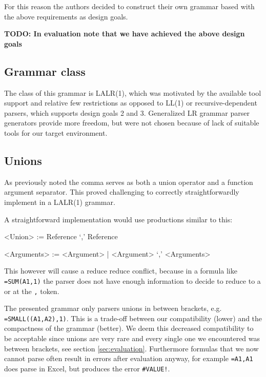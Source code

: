 \documentclass[conference]{IEEEtran}
\newcommand{\todo}[1]{\textbf{TODO: #1}}
\begin{document}
For this reason the authors decided to construct their own grammar based with the above requirements as design goals.

\todo{In evaluation note that we have achieved the above design goals}

\subsection{Grammar class}

The class of this grammar is LALR(1), which was motivated by the available tool support and relative few restrictions as opposed to LL(1) or recursive-dependent parsers, which supports design goals 2 and 3.
Generalized LR grammar parser generators provide more freedom, but were not chosen because of lack of suitable tools for our target environment.

\subsection{Unions}
\label{subsec:desing:unions}

As previously noted the comma serves as both a union operator and a function argument separator.
This proved challenging to correctly straightforwardly implement in a LALR(1) grammar.

A straightforward implementation would use productions similar to this:

\begin{grammar}
<Union> := Reference `,' Reference

<Arguments> := <Argument> | <Argument> `,' <Arguments>
\end{grammar}

This however will cause a reduce reduce conflict, because in a formula like \texttt{=SUM(A1,1)} the parser does not have enough information to decide to reduce to a  or  at the \texttt{,} token.

The presented grammar only parsers unions in between brackets, e.g. \texttt{=SMALL((A1,A2),1)}.
This is a trade-off between our compatibility (lower) and the compactness of the grammar (better).
We deem this decreased compatibility to be acceptable since unions are very rare and every single one we encountered was between brackets, see section \ref{sec:evaluation}.
Furthermore formulas that we now cannot parse often result in errors after evaluation anyway, for example \texttt{=A1,A1} does parse in Excel, but produces the error \texttt{\#VALUE!}.
\end{document}
